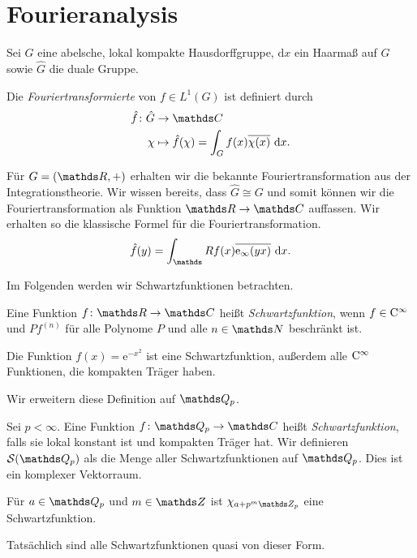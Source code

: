 \chapter{Fourieranalysis}
Sei $G$ eine abelsche, lokal kompakte Hausdorffgruppe, $\mathrm{d}x$ ein Haarmaß auf $G$
sowie $\hat{G}$ die duale Gruppe.
\begin{defi}
Die \emph{Fouriertransformierte} von $f \in \mathit{L}^1(G)$ ist definiert durch
\begin{align*}
\hat{f}\colon \hat{G} &\to \C\\
\chi &\mapsto \hat{f}(\chi)=\int_G f(x)\overline{\chi(x)}~\mathrm{d}x.
\end{align*}
\end{defi}

\begin{bsp}
Für $G=(\R,+)$ erhalten wir die bekannte Fouriertransformation aus der Integrationstheorie.
Wir wissen bereits, dass $\hat{G} \cong G$ und somit können wir die Fouriertransformation als Funktion $\R \to \C$ auffassen.
Wir erhalten so die klassische Formel für die Fouriertransformation.
\begin{align*}
\hat{f}(y)=\int_\R f(x)\overline{\mathrm{e}_{\infty}(yx)}~\mathrm{d}x.
\end{align*}
\end{bsp}

Im Folgenden werden wir Schwartzfunktionen betrachten.
\begin{defi}
Eine Funktion $f\colon \R \to \C$ heißt \emph{Schwartzfunktion}, wenn $f \in \mathrm{C}^\infty$ und $Pf^{(n)}$ für alle Polynome $P$ und alle $n \in \N$ beschränkt ist.
\end{defi}
\begin{bsp}
Die Funktion $f(x)=\mathrm{e}^{-x^2}$ ist eine Schwartzfunktion, außerdem alle $\mathrm{C}^\infty$ Funktionen, die kompakten Träger haben.
\end{bsp}
Wir erweitern diese Definition auf $\Q_p$.
\begin{defi}
Sei $p<\infty$. Eine Funktion $f \colon \Q_p \to \C$ heißt \emph{Schwartzfunktion}, falls sie lokal konstant ist und kompakten Träger hat.
Wir definieren $\Sq$ als die Menge aller Schwartzfunktionen auf $\Q_p$.
Dies ist ein komplexer Vektorraum.
\end{defi}
\begin{bsp}
Für $a \in \Q_p$ und $m\in \Z$ ist $\chi_{a+p^m\Z_p}$ eine Schwartzfunktion.
\end{bsp}

Tatsächlich sind alle Schwartzfunktionen quasi von dieser Form.

